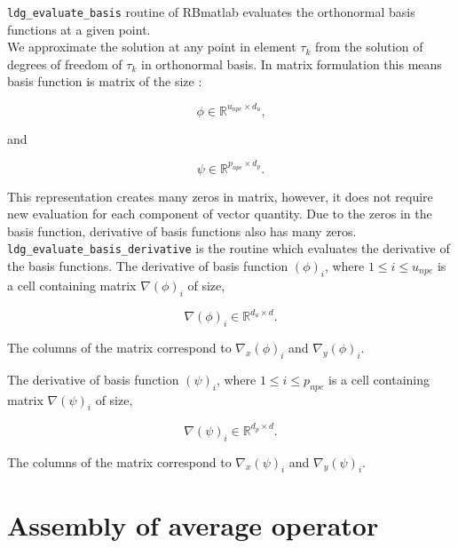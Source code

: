 \documentclass[a4paper,twoside,openright]{book}
\begin{document}
\verb|ldg_evaluate_basis| routine of RBmatlab evaluates the orthonormal basis functions at a given point.\\

We approximate the solution at any point in element $\tau_k$ from the solution of degrees of freedom of $\tau_k$ in orthonormal basis. In matrix formulation this means basis function is matrix of the size :

\begin{equation}\label{basis_func_velocity_rbmatlab}
\phi \in \mathbb{R}^{u_{npe} \times d_u} \textrm{,}
\end{equation}

and

\begin{equation}\label{basis_func_pressure_rbmatlab}
\psi \in \mathbb{R}^{p_{npe} \times d_p} \textrm{.}
\end{equation}

This representation creates many zeros in matrix, however, it does not require new evaluation for each component of vector quantity. Due to the zeros in the basis function, derivative of basis functions also has many zeros.\\

\verb|ldg_evaluate_basis_derivative| is the routine which evaluates the derivative of the basis functions. The derivative of basis function $(\phi)_{i}$, where $1 \leq i \leq u_{npe}$ is a cell containing matrix $\nabla (\phi)_{i}$ of size,

\begin{equation}\label{basis_func_derivative_velocity_rbmatlab}
\nabla (\phi)_{i} \in \mathbb{R}^{{d_u} \times d} \textrm{.}
\end{equation}

The columns of the matrix correspond to $\nabla_x (\phi)_{i}$ and $\nabla_y (\phi)_{i}$.

The derivative of basis function $(\psi)_{i}$, where $1 \leq i \leq p_{npe}$ is a cell containing matrix $\nabla (\psi)_{i}$ of size,

\begin{equation}\label{basis_func_derivative_pressure_rbmatlab}
\nabla (\psi)_{i} \in \mathbb{R}^{{d_p} \times d} \textrm{.}
\end{equation}

The columns of the matrix correspond to $\nabla_x (\psi)_{i}$ and $\nabla_y (\psi)_{i}$.

\section{Assembly of average operator}
\end{document}
